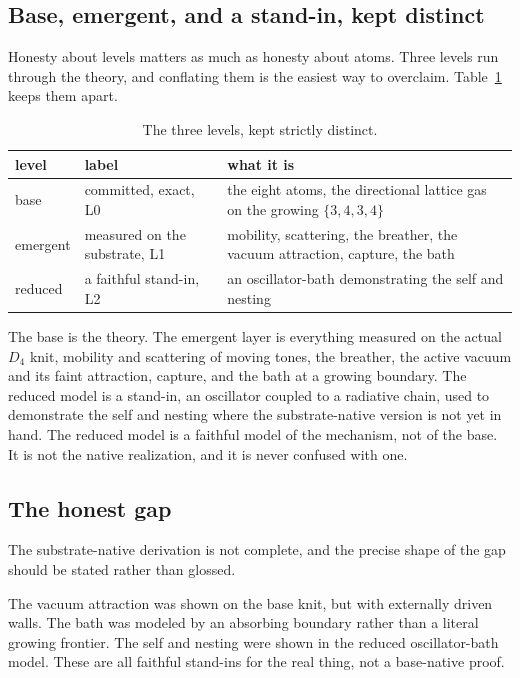 \subsection{Base, emergent, and a stand-in, kept distinct}

Honesty about levels matters as much as honesty about atoms. Three levels run through the theory, and conflating them is the easiest way to overclaim. Table~\ref{tab:three-levels} keeps them apart.

\begin{table}[ht]
\centering
\begin{tabular}{@{}lll@{}}
\toprule
level & label & what it is \\
\midrule
base & committed, exact, L0 & the eight atoms, the directional lattice gas on the growing $\{3,4,3,4\}$ \\
emergent & measured on the substrate, L1 & mobility, scattering, the breather, the vacuum attraction, capture, the bath \\
reduced & a faithful stand-in, L2 & an oscillator-bath demonstrating the self and nesting \\
\bottomrule
\end{tabular}
\caption{The three levels, kept strictly distinct.}
\label{tab:three-levels}
\end{table}

The base is the theory. The emergent layer is everything measured on the actual $D_4$ knit, mobility and scattering of moving tones, the breather, the active vacuum and its faint attraction, capture, and the bath at a growing boundary. The reduced model is a stand-in, an oscillator coupled to a radiative chain, used to demonstrate the self and nesting where the substrate-native version is not yet in hand. The reduced model is a faithful model of the mechanism, not of the base. It is not the native realization, and it is never confused with one.

\subsection{The honest gap}

The substrate-native derivation is not complete, and the precise shape of the gap should be stated rather than glossed.

The vacuum attraction was shown on the base knit, but with externally driven walls. The bath was modeled by an absorbing boundary rather than a literal growing frontier. The self and nesting were shown in the reduced oscillator-bath model. These are all faithful stand-ins for the real thing, not a base-native proof.

